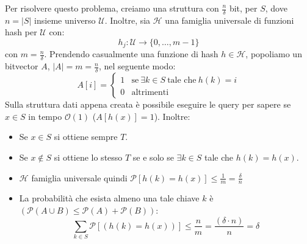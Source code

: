 Per risolvere questo problema, creiamo una struttura con $\frac{n}{\delta}$ bit,
per $S$, dove $n = |S|$ insieme universo $\mathcal{U}$. Inoltre, sia $\mathcal{H}$
una famiglia universale di funzioni hash per $\mathcal{U}$ con:
\begin{equation}
    h_j : \mathcal{U} \to \{0, \dots, m - 1\}
\end{equation}
con $m = \frac{n}{\delta}$. Prendendo casualmente una funzione di hash $h \in
    \mathcal{H}$, popoliamo un bitvector $A$, $|A| = m = \frac{n}{\delta}$,
nel seguente modo:
\begin{equation}
    A[i] = \begin{cases}
        1 & \text{se} \ \exists k \in S \ \text{tale che} \ h(k) = i \\
        0 & \text{altrimenti}
    \end{cases}
\end{equation}
Sulla struttura dati appena creata è possibile eseguire le query per sapere se
$x \in S$ in tempo $\mathcal{O}(1)$ ($A[h(x)] = 1$). Inoltre:
\begin{itemize}
    \item Se $x \in S$ si ottiene sempre $T$.
    \item Se $x \notin S$ si ottiene lo stesso $T$ se e solo se $\exists k \in S$
          tale che $h(k) = h(x)$.
    \item $\mathcal{H}$ famiglia universale quindi $\mathcal{P}[h(k) = h(x)]
              \leq \frac{1}{m} = \frac{\delta}{n}$
    \item La probabilità che esista almeno una tale chiave $k$ è
          $(\mathcal{P}(A \cup B) \leq \mathcal{P}(A) + \mathcal{P}(B))$:
          \begin{equation}
              \sum_{k \in S} \mathcal{P}[(h(k) = h(x))] \leq \frac{n}{m} =
              \frac{(\delta \cdot n)}{n} = \delta
          \end{equation}
\end{itemize}
